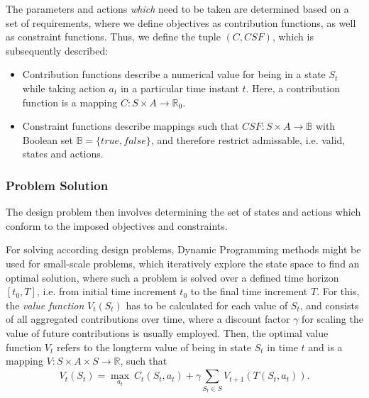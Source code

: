 \documentclass[a4paper,twoside]{article}
\begin{document}
	The parameters and actions \textit{which} need to be taken are determined based on a set of requirements, where we define objectives as contribution functions, as well as constraint functions. Thus, we define the tuple $(C, CSF)$, which is subsequently described:
	
	\begin{itemize}
		\item Contribution functions describe a numerical value for being in a state $S_{t}$ while taking action $a_{t}$ in a particular time instant $t$. Here, a contribution function is a mapping $C : S \times A \to \mathbb{R}_0$.
		\item Constraint functions describe mappings such that $CSF : S \times A \to \mathbb{B}$ with Boolean set $\mathbb{B} = \{\mathit{true},\mathit{false}\}$, and therefore restrict admissable, i.e. valid, states and actions. 
	\end{itemize}
	
	\subsubsection{Problem Solution}
	The design problem then involves determining the set of states and actions which conform to the imposed objectives and constraints. 
	
	For solving according design problems, Dynamic Programming \cite{bellman_dynamic_1957} methods might be used for small-scale problems, which iteratively explore the state space to find an optimal solution, where such a problem is solved over a defined time horizon $[t_0,T]$, i.e. from initial time increment $t_0$ to the final time increment $T$. For this, the \textit{value function} $V_t(S_t)$ has to be calculated for each value of $S_t$, and consists of all aggregated contributions over time, where a discount factor $\gamma$ for scaling the value of future contributions is usually employed. Then, the optimal value function $V_t$ refers to the longterm value of being in state $S_t$ in time $t$ and is a mapping $V : S \times A \times S \to \mathbb{R}$, such that
	\begin{equation}
		V_t(S_t) = \max_{a_t}\ C_t(S_t,a_t) + \gamma \sum_{S_t \in S}^{}V_{t+1}(T(S_t,a_t)) \mathrm{.}
	\end{equation}
	
\end{document}
